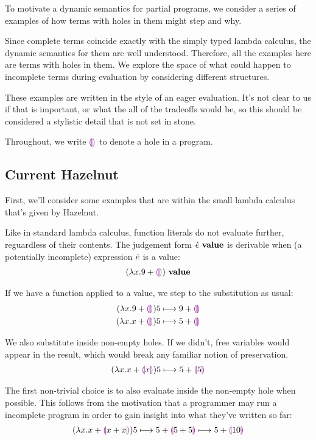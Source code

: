 To motivate a dynamic semantics for partial programs, we consider a series
of examples of how terms with holes in them might step and why.

Since complete terms coincide exactly with the simply typed lambda
calculus, the dynamic semantics for them are well understood. Therefore,
all the examples here are terms with holes in them. We explore the space of
what could happen to incomplete terms during evaluation by considering
different structures.

These examples are written in the style of an eager evaluation. It's not
clear to us if that is important, or what the all of the tradeoffs would
be, so this should be considered a stylistic detail that is not set in
stone.

Throughout, we write $\textcolor{violet}{\llparenthesis}\textcolor{violet}{\rrparenthesis}$ to denote a hole in a program.

\subsection{Current Hazelnut}
First, we'll consider some examples that are within the small lambda
calculus that's given by Hazelnut.

Like in standard lambda calculus, function literals do not
evaluate further, reguardless of their contents.
%
The judgement form ${\dot{e}} ~\mathbf{value}$ is derivable when (a potentially incomplete) expression $\dot{e}$ is a value:
\begin{align*}
  {(\lambda x. 9 + \textcolor{violet}{\llparenthesis}\textcolor{violet}{\rrparenthesis})} ~\mathbf{value}
\end{align*}

If we have a function applied to a value, we step to the substitution as
usual:
\begin{align*}
  {
        (\lambda x.9 + \textcolor{violet}{\llparenthesis}\textcolor{violet}{\rrparenthesis})5
      } \longmapsto {
        9 + \textcolor{violet}{\llparenthesis}\textcolor{violet}{\rrparenthesis}}
      \\
      {
        (\lambda x.x + \textcolor{violet}{\llparenthesis}\textcolor{violet}{\rrparenthesis})5
      } \longmapsto {
        5 + \textcolor{violet}{\llparenthesis}\textcolor{violet}{\rrparenthesis}}
\end{align*}

We also substitute inside non-empty holes. If we didn't, free variables
would appear in the result, which would break any familiar notion of
preservation.
\begin{align*}
  {
        (\lambda x.x + \textcolor{violet}{\llparenthesis}x\textcolor{violet}{\rrparenthesis})5
      } \longmapsto {
        5 + \textcolor{violet}{\llparenthesis}5\textcolor{violet}{\rrparenthesis}}
\end{align*}

The first non-trivial choice is to also evaluate inside the non-empty hole
when possible. 
%
%
This follows from the motivation that a programmer may run a
incomplete program in order to gain insight into what they've written so
far:
\begin{align*}
  {
    {
          (\lambda x.x + \textcolor{violet}{\llparenthesis}x + x\textcolor{violet}{\rrparenthesis})5
        } \longmapsto {
          5 + \textcolor{violet}{\llparenthesis}5 + 5\textcolor{violet}{\rrparenthesis}}
  } \longmapsto {5 + \textcolor{violet}{\llparenthesis}10\textcolor{violet}{\rrparenthesis}}
\end{align*}

